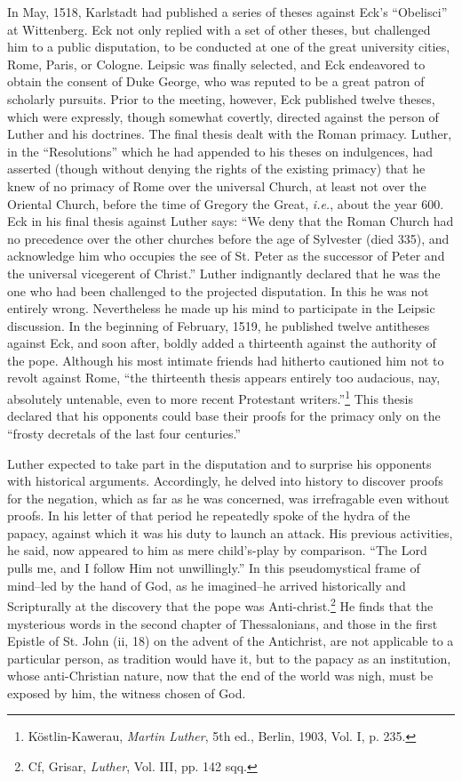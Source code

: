 In May, 1518, Karlstadt had published a series of theses against
Eck’s “Obelisci” at Wittenberg. Eck not only replied with a set of
other theses, but challenged him to a public disputation, to be conducted
at one of the great university cities, Rome, Paris, or Cologne.
Leipsic was finally selected, and Eck endeavored to obtain the consent
of Duke George, who was reputed to be a great patron of scholarly
pursuits. Prior to the meeting, however, Eck published twelve
theses, which were expressly, though somewhat covertly, directed
against the person of Luther and his doctrines. The final thesis dealt
with the Roman primacy. Luther, in the “Resolutions” which he had
appended to his theses on indulgences, had asserted (though without
denying the rights of the existing primacy) that he knew of no primacy
of Rome over the universal Church, at least not over the Oriental Church,
before the time of Gregory the Great, \textit{i.e.}, about the
year 600. Eck in his final thesis against Luther says: “We deny that
the Roman Church had no precedence over the other churches before
the age of Sylvester (died 335), and acknowledge him who occupies
the see of St. Peter as the successor of Peter and the universal vicegerent
of Christ.” Luther indignantly declared that he was the one
who had been challenged to the projected disputation. In this he was
not entirely wrong. Nevertheless he made up his mind to participate
in the Leipsic discussion. In the beginning of February, 1519, he
published twelve antitheses against Eck, and soon after, boldly added
a thirteenth against the authority of the pope. Although his most intimate
friends had hitherto cautioned him not to revolt against Rome,
“the thirteenth thesis appears entirely too audacious, nay, absolutely
untenable, even to more recent Protestant writers.”\footnote
{Köstlin-Kawerau, \textit{Martin Luther}, 5th ed., Berlin, 1903, Vol. I, p. 235.}
This thesis
declared that his opponents could base their proofs for the primacy only
on the “frosty decretals of the last four centuries.”

Luther expected to take part in the disputation and to surprise his
opponents with historical arguments. Accordingly, he delved into
history to discover proofs for the negation, which as far as he was
concerned, was irrefragable even without proofs. In his letter of that
period he repeatedly spoke of the hydra of the papacy, against which
it was his duty to launch an attack. His previous activities, he said,
now appeared to him as mere child's-play by comparison. ``The Lord
pulls me, and I follow Him not unwillingly.'' In this pseudomystical
frame of mind--led by the hand of God, as he imagined--he arrived
historically and Scripturally at the discovery that the pope was Anti-christ.\footnote
{Cf, Grisar, \textit{Luther}, Vol. III, pp. 142 sqq.}
He finds that the mysterious words in the second chapter of
Thessalonians, and those in the first Epistle of St. John (ii, 18) on the
advent of the Antichrist, are not applicable to a particular person, as
tradition would have it, but to the papacy as an institution, whose anti-Christian
nature, now that the end of the world was nigh, must be
exposed by him, the witness chosen of God.

